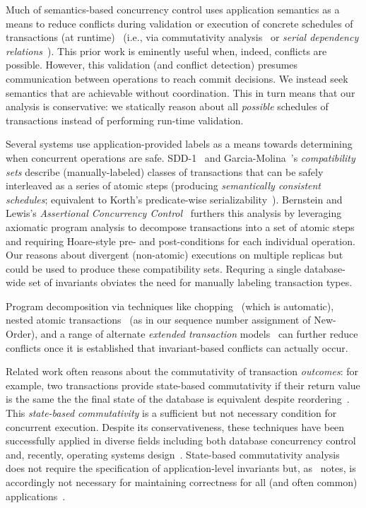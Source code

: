 Much of semantics-based concurrency control uses application semantics
as a means to reduce conflicts during validation or execution of
concrete schedules of transactions (at
runtime)~\cite{badrinath-semantics} (i.e., via commutativity
analysis~\cite{weihl-thesis} or \textit{serial dependency
  relations}~\cite{herlihy-apologizing}). This prior work is eminently
useful when, indeed, conflicts are possible. However, this validation
(and conflict detection) presumes communication between operations to
reach commit decisions. We instead seek semantics that are achievable
without coordination. This in turn means that our \iconfluence
analysis is conservative: we statically reason about all
\textit{possible} schedules of transactions instead of performing
run-time validation.

Several systems use application-provided labels as a means towards
determining when concurrent operations are safe. SDD-1~\cite{sdd1} and
Garcia-Molina~\cite{garciamolina-semantics}'s \textit{compatibility
  sets} describe (manually-labeled) classes of transactions that can
be safely interleaved as a series of atomic steps (producing
\textit{semantically consistent schedules}; equivalent to Korth's
predicate-wise
serializability~\cite{korth-serializability}). Bernstein and Lewis's
\textit{Assertional Concurrency Control}~\cite{decomp-semantics}
furthers this analysis by leveraging axiomatic program analysis to
decompose transactions into a set of atomic steps and requiring
Hoare-style pre- and post-conditions for each individual
operation. Our \iconfluence reasons about divergent (non-atomic)
executions on multiple replicas but could be used to produce these
compatibility sets. Requring a single database-wide set of invariants
obviates the need for manually labeling transaction types.

Program decomposition via techniques like chopping~\cite{chopping}
(which is automatic), nested atomic
transactions~\cite{atomictransactions} (as in our sequence number
assignment of New-Order), and a range of alternate \textit{extended
  transaction} models~\cite{acta} can further reduce conflicts once it
is established that invariant-based conflicts can actually occur.

 Related work often reasons about
the commutativity of transaction \textit{outcomes}: for example, two
transactions provide state-based commutativity if their return value
is the same the the final state of the database is equivalent despite
reordering~\cite{weihl-data,weihl-thesis}. This \textit{state-based
  commutativity} is a sufficient but not necessary condition for
concurrent execution. Despite its conservativeness, these techniques
have been successfully applied in diverse fields including both
database concurrency control and, recently, operating systems
design~\cite{kohler-commutativity}. State-based commutativity analysis
does not require the specification of application-level invariants
but, as~\cite{kohler-commutativity} notes, is accordingly not
necessary for maintaining correctness for all (and often common)
applications~\cite{lamport-audit}.

